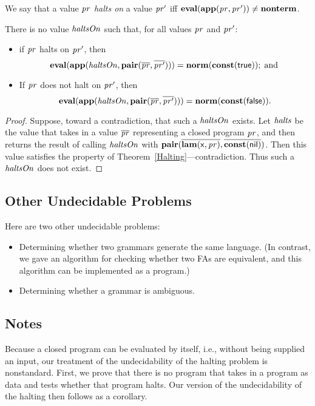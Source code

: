%
We say that a value $\mathit{pr}$ \emph{halts on} a value $\mathit{pr}'$ iff
$\mathbf{eval}(\mathbf{app}(\mathit{pr},\mathit{pr}'))\neq\mathbf{nonterm}$.

\begin{corollary}
There is no value $\mathit{haltsOn}$ such that, for all values
$\mathit{pr}$ and $\mathit{pr}'$:
\begin{itemize}
\item if $\mathit{pr}$ halts on $\mathit{pr}'$, then
  \begin{displaymath}
    \mathbf{eval}(\mathbf{app}(\mathit{haltsOn},\mathbf{pair}(\overline{\mathit{pr}},\overline{\mathit{pr}'}))) =
    \mathbf{norm}(\mathbf{const}(\mathsf{true})) ; \;\allowbreak\mbox{and}\allowbreak\;
  \end{displaymath}

\item If $\mathit{pr}$ does not halt on $\mathit{pr}'$, then
  \begin{displaymath}
    \mathbf{eval}(\mathbf{app}(\mathit{haltsOn},\mathbf{pair}(\overline{\mathit{pr}},\overline{\mathit{pr}'}))) =
    \mathbf{norm}(\mathbf{const}(\mathsf{false})) .
  \end{displaymath}
\end{itemize}
\end{corollary}

\begin{proof}
Suppose, toward a contradiction, that such a $\mathit{haltsOn}$ exists.  Let
$\mathit{halts}$ be the value that takes in a value $\overline{\mathit{pr}}$
representing a closed program $\mathit{pr}$, and then returns the result of
calling $\mathit{haltsOn}$ with
$\mathbf{pair}(\overline{\mathbf{lam}(\mathsf{x},\mathit{pr})},\overline{\mathbf{const}(\mathsf{nil})})$.
Then this value satisfies the property of
Theorem~\ref{Halting}---contradiction.  Thus such a $\mathit{haltsOn}$ does
not exist.
\end{proof}

%

\subsection{Other Undecidable Problems}

Here are two other undecidable problems:
\begin{itemize}
\item Determining whether two grammars generate the same language.
(In contrast, we gave an algorithm for checking whether two FAs are
equivalent, and this algorithm can be implemented as a program.)

\item Determining whether a grammar is ambiguous.
\end{itemize}

\subsection{Notes}

Because a closed program can be evaluated by itself, i.e., without
being supplied an input, our treatment of the undecidability of
the halting problem is nonstandard.  First, we prove that there is
no program that takes in a program as data and tests whether that
program halts.  Our version of the undecidability of the halting
then follows as a corollary.

